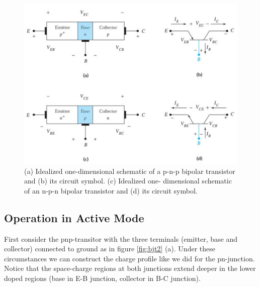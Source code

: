 \begin{figure}[h!]
\centering
\includegraphics[width=12cm]{figures/ch01/bjt1.jpg}
\caption{(a) Idealized one-dimensional schematic of a p-n-p bipolar transistor and (b) its circuit symbol. (c) Idealized one- dimensional schematic of an n-p-n bipolar transistor and (d) its circuit symbol.} 
\label{fig:bjt1}
\end{figure}

\subsection{Operation in Active Mode}
First consider the pnp-transitor with the three terminals (emitter, base and collector) connected to ground as in figure \ref{fig:bjt2} (a). Under these circumstances we can construct the charge profile like we did for the pn-junction. Notice that the space-charge regions at both junctions extend deeper in the lower doped regions (base in E-B junction, collector in B-C junction).

